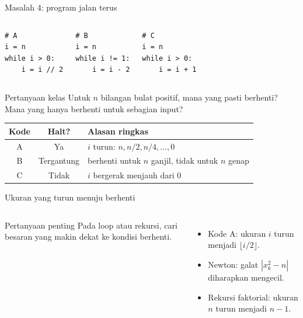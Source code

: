 \documentclass[aspectratio=169,11pt]{beamer}
\begin{document}
\begin{frame}[fragile]{Masalah 4: program jalan terus}
\begin{columns}[T]
\begin{lstlisting}[basicstyle=\ttfamily\tiny]
# A
i = n
while i > 0:
    i = i // 2
\end{lstlisting}
\begin{lstlisting}[basicstyle=\ttfamily\tiny]
# B
i = n
while i != 1:
    i = i - 2
\end{lstlisting}
\begin{lstlisting}[basicstyle=\ttfamily\tiny]
# C
i = n
while i > 0:
    i = i + 1
\end{lstlisting}
\end{columns}
\vspace{2mm}
\begin{block}{Pertanyaan kelas}
Untuk $n$ bilangan bulat positif, mana yang pasti berhenti? Mana yang hanya berhenti untuk sebagian input?
\end{block}
\pause
\begin{center}
\begin{tabular}{ccl}
\toprule
Kode & Halt? & Alasan ringkas\\
\midrule
A & Ya & $i$ turun: $n,n/2,n/4,\ldots,0$\\
B & Tergantung & berhenti untuk $n$ ganjil, tidak untuk $n$ genap\\
C & Tidak & $i$ bergerak menjauh dari 0\\
\bottomrule
\end{tabular}
\end{center}
\end{frame}

\begin{frame}{Ukuran yang turun menuju berhenti}
\begin{columns}[T]
\begin{block}{Pertanyaan penting}
Pada loop atau rekursi, cari besaran yang makin dekat ke kondisi berhenti.
\end{block}
\begin{itemize}
  \item Kode A: ukuran $i$ turun menjadi $\lfloor i/2\rfloor$.
  \item Newton: galat $|x_k^2-n|$ diharapkan mengecil.
  \item Rekursi faktorial: ukuran $n$ turun menjadi $n-1$.
\end{itemize}
\end{columns}
\end{frame}
\end{document}
